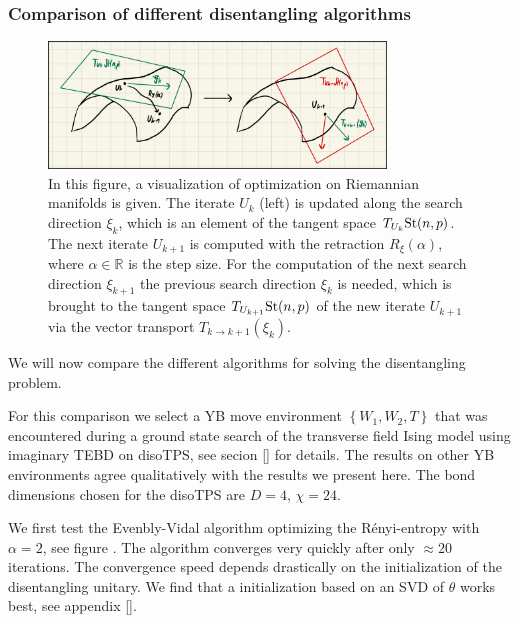 \subsubsection*{Comparison of different disentangling algorithms}
\begin{figure}
	\centering
	\includegraphics[width=0.8\textwidth]{figures/disoTPS/disentangling_riemannian_optimization.jpeg}
	\caption{In this figure, a visualization of optimization on Riemannian manifolds is given. The iterate $U_k$ (left) is updated along the search direction $\xi_k$, which is an element of the tangent space $T_{U_k}\text{St}(n,p)$. The next iterate $U_{k+1}$ is computed with the retraction $R_\xi\left(\alpha\right)$, where $\alpha\in\mathbb{R}$ is the step size. For the computation of the next search direction $\xi_{k+1}$ the previous search direction $\xi_k$ is needed, which is brought to the tangent space $T_{U_{k+1}}\text{St}(n,p)$ of the new iterate $U_{k+1}$ via the vector transport $T_{k\rightarrow k+1}\left(\xi_k\right)$.}
	\label{fig:disentangling_riemannian_optimization}
\end{figure}
We will now compare the different algorithms for solving the disentangling problem.


For this comparison we select a YB move environment $\left\{W_1, W_2, T\right\}$ that was encountered during a ground state search of the transverse field Ising model using imaginary TEBD on disoTPS, see secion \ref{} for details. The results on other YB environments agree qualitatively with the results we present here. The bond dimensions chosen for the disoTPS are $D = 4$, $\chi = 24$. \par
We first test the Evenbly-Vidal algorithm optimizing the Rényi-entropy with $\alpha = 2$, see figure . The algorithm converges very quickly after only $\approx 20$ iterations. The convergence speed depends drastically on the initialization of the disentangling unitary. We find that a initialization based on an SVD of $\theta$ works best, see appendix \ref{}. \par

